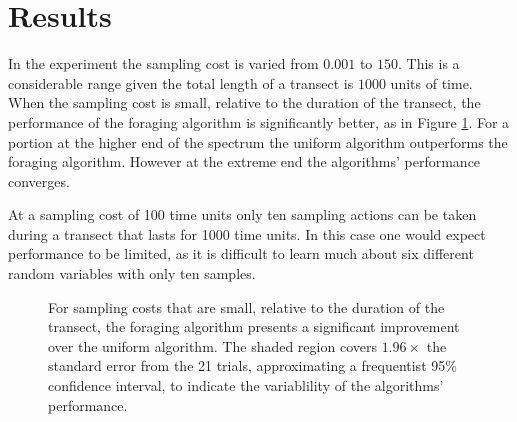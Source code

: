 \section{Results}
\label{sec:results}




% 

% 

In the experiment the sampling cost is varied from $0.001$ to $150$.  This is a considerable range given the total length of a transect is $1000$ units of time.  When the sampling cost is small, relative to the duration of the transect, the performance of the foraging algorithm is significantly better, as in Figure \ref{fig:err}.  For a portion at the higher end of the spectrum the uniform algorithm outperforms the foraging algorithm.  However at the extreme end the algorithms' performance converges.  

At a sampling cost of 100 time units only ten sampling actions can be taken during a transect that lasts for 1000 time units.  In this case one would expect performance to be limited, as it is difficult to learn much about six different random variables with only ten samples.  


\begin{figure}[htpd!]
	\centering
	\def\svgwidth{\columnwidth}
	
	\caption{For sampling costs that are small, relative to the duration of the transect, the foraging algorithm presents a significant improvement over the uniform algorithm.  The shaded region covers $1.96\times$ the standard error from the 21 trials, approximating a frequentist 95\% confidence interval, to indicate the variablility of the algorithms' performance.}
	\label{fig:err}
\end{figure}

